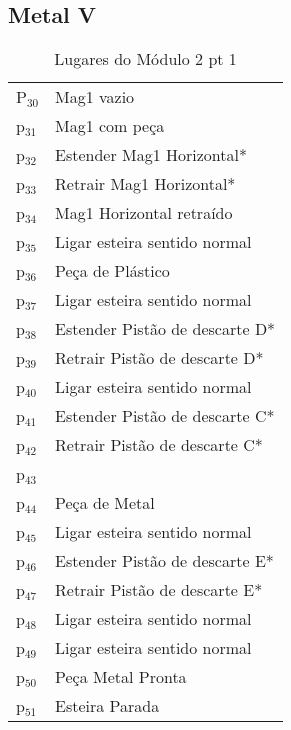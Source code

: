 \documentclass[11pt]{article}
\begin{document}
\subsection{Metal V}
\label{sec-1-2}

\begin{table}[htb]
\caption{Lugares do Módulo 2 pt 1}
\centering
\begin{tabular}{ll}
P$_{\text{30}}$ & Mag1 vazio\\
p$_{\text{31}}$ & Mag1 com peça\\
p$_{\text{32}}$ & Estender Mag1 Horizontal*\\
p$_{\text{33}}$ & Retrair Mag1 Horizontal*\\
p$_{\text{34}}$ & Mag1 Horizontal retraído\\
p$_{\text{35}}$ & Ligar esteira sentido normal\\
p$_{\text{36}}$ & Peça de Plástico\\
p$_{\text{37}}$ & Ligar esteira sentido normal\\
p$_{\text{38}}$ & Estender Pistão de descarte D*\\
p$_{\text{39}}$ & Retrair Pistão de descarte D*\\
p$_{\text{40}}$ & Ligar esteira sentido normal\\
p$_{\text{41}}$ & Estender Pistão de descarte C*\\
p$_{\text{42}}$ & Retrair Pistão de descarte C*\\
p$_{\text{43}}$ & \\
p$_{\text{44}}$ & Peça de Metal\\
p$_{\text{45}}$ & Ligar esteira sentido normal\\
p$_{\text{46}}$ & Estender Pistão de descarte E*\\
p$_{\text{47}}$ & Retrair Pistão de descarte E*\\
p$_{\text{48}}$ & Ligar esteira sentido normal\\
p$_{\text{49}}$ & Ligar esteira sentido normal\\
p$_{\text{50}}$ & Peça Metal Pronta\\
p$_{\text{51}}$ & Esteira Parada\\
\end{tabular}
\end{table}
\end{document}
